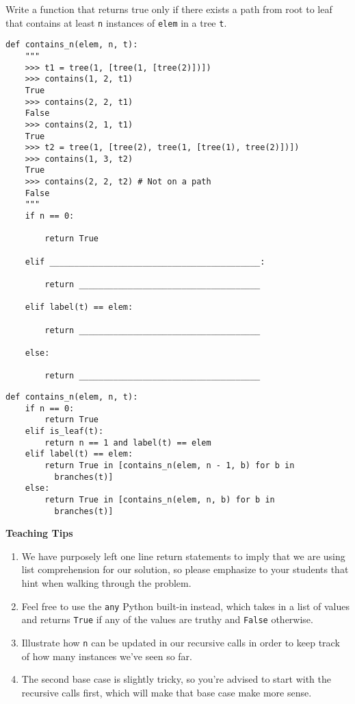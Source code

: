 \begin{blocksection}
\question Write a function that returns true only if there exists a path from root to leaf that contains at least \lstinline$n$ instances of \lstinline$elem$ in a tree \lstinline$t$.

\begin{lstlisting}
def contains_n(elem, n, t):
    """
    >>> t1 = tree(1, [tree(1, [tree(2)])])
    >>> contains(1, 2, t1)
    True
    >>> contains(2, 2, t1)
    False
    >>> contains(2, 1, t1)
    True
    >>> t2 = tree(1, [tree(2), tree(1, [tree(1), tree(2)])])
    >>> contains(1, 3, t2)
    True
    >>> contains(2, 2, t2) # Not on a path
    False
    """
    if n == 0:

        return True

    elif ___________________________________________:

        return _____________________________________

    elif label(t) == elem:

        return _____________________________________

    else:

        return _____________________________________
\end{lstlisting}
\end{blocksection}

\begin{blocksection}
\begin{solution}
\begin{lstlisting}
def contains_n(elem, n, t):
    if n == 0:
        return True
    elif is_leaf(t):
        return n == 1 and label(t) == elem
    elif label(t) == elem:
        return True in [contains_n(elem, n - 1, b) for b in     
          branches(t)]
    else:
        return True in [contains_n(elem, n, b) for b in 
          branches(t)]
\end{lstlisting}
\end{solution}
\end{blocksection}

\begin{questionmeta}
    \textbf{Teaching Tips}
    \begin{enumerate}
            \item We have purposely left one line return statements to imply that we are using list comprehension for our solution, so please emphasize to your students that hint when walking through the problem.
            \item Feel free to use the \texttt{any} Python built-in instead, which takes in a list of values and returns \texttt{True} if any of the values are truthy and \texttt{False} otherwise.
            \item Illustrate how \texttt{n} can be updated in our recursive calls in order to keep track of how many instances we've seen so far.
            \item The second base case is slightly tricky, so you're advised to start with the recursive calls first, which will make that base case make more sense.
    \end{enumerate}
\end{questionmeta}